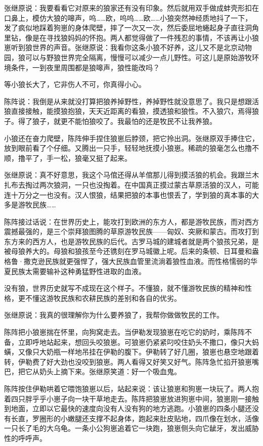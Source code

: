 \par 张继原说：我要看看它对原来的狼家还有没有印象。然后就用双手做成蚌壳形扣在口鼻上，模仿大狼的嗥声，呜……欧，呜呜……欧……小狼突然神经质地抖了一下，发了疯似地踩着狗崽的身体爬壁，摔了一次又一次，然后委屈地蜷起身子直往洞角里钻，像是在寻找狼妈妈的怀抱。两人都觉得做了一件残忍的事情，不该再让小狼崽听到狼世界的声音。张继原说：我看你这条小狼不好养，这儿又不是北京动物园，狼可以与野狼世界完全隔离，慢慢可以减少一点儿野性。可这儿是原始游牧环境条件，一到夜里周围都是狼嗥声，狼性能改吗？
\par 等小狼长大了，它非伤人不可，你真得小心。
\par 陈阵说：我倒是从来就没打算把狼养掉野性，养掉野性就没意思了。我只是想跟活狼直接接触，能摸狼抱狼，天天近距离的看狼，摸透狼和狼性。不入狼穴，焉得狼子。得了狼子，就更不能怕狼咬了。我最怕的还是牧民不让我养狼。
\par 小狼还在奋力爬壁，陈阵伸手捏住狼崽后脖颈，把它拎出洞。张继原双手捧住它，放到眼前看了个仔细。又腾出一只手，轻轻地抚摸小狼崽。稀疏的狼毫怎么也撸不顺，撸平了，手一松，狼毫又挺了起来。
\par 张继原说：真不好意思，我这个马倌还得从羊倌那儿得到摸活狼的机会。我跟兰木扎布去掏过两次狼洞，一只也没掏着。在中国真正摸过蒙古草原活狼的汉人，可能连十万分之一也没有。汉人恨狼，结果把狼的本事也恨丢了，学到狼的真本事的大多是游牧民族……
\par 陈阵接过话说：在世界历史上，能攻打到欧洲的东方人，都是游牧民族，而对西方震撼最强的，是三个崇拜狼图腾的草原游牧民族——匈奴、突厥和蒙古。而攻打到东方来的西方人，也是游牧民族的后代。古罗马城的建城者就是两个狼孩兄弟，是被母狼养大的。母狼和狼孩至今还镌刻在罗马城徽上呢。后来的条顿、日耳曼和盎格鲁·撒克逊民族就更强悍了，强大民族血管里流淌着狼性血液。而性格懦弱的华夏民族太需要输补这种勇猛野性进取的血液。
\par 没有狼，世界历史就写不成现在这个样子。不懂狼，就不懂游牧民族的精神和性格，更不懂这游牧民族和农耕民族的差别和各自的优劣。
\par 张继原说：我真的很理解你为什么要养狼了，我帮你做做牧民的工作。
\par 陈阵把小狼崽揣在怀里，向狗窝走去。当伊勒发现狼崽在吃它的奶时，乘陈阵不备，立即呼地站起来，想回头咬狼崽。可狼崽仍紧紧叼咬住奶头不撒口，像只大蚂蟥，又像只大奶瓶一样地吊挂在伊勒的腹下。伊勒转了好几圈，狼崽也悬空地跟着转，伊勒费了好大劲也没咬到狼崽。两人看得又好笑又好气。陈阵急忙掐开狼崽嘴巴，把它从奶头上摘下来。张继原笑道：好一个吸血鬼。
\par 陈阵按住伊勒哄着它喂饱狼崽以后，站起来说：该让狼崽和狗崽一块玩了。两人抱着四只胖乎乎小崽子向一块干草地走去。陈阵把狼崽放进狗崽中间，狼崽刚一接触到地面，立即以它最快的速度向没有人没有狗的地方逃跑。小狼崽的四条小腿还没有长直，罗圈形的小嫩腿还支撑不起身体，跑起来肚皮贴地，四爪像在划水，活像一只长了毛的大乌龟。一条小公狗崽追着它一块跑，狼崽侧头向它龇牙，发出威胁性的呼呼声。
